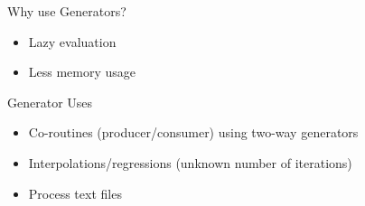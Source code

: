 \documentclass[11pt]{beamer}
\begin{document}
\begin{frame}[fragile]{Why use Generators?}
    \begin{itemize}
        \item Lazy evaluation
        \item Less memory usage
    \end{itemize}
\end{frame}

\begin{frame}[fragile]{Generator Uses}
    \begin{itemize}
        \item Co-routines (producer/consumer) using two-way generators
        \item Interpolations/regressions (unknown number of iterations)
        \item Process text files
    \end{itemize}
\end{frame}
\end{document}
